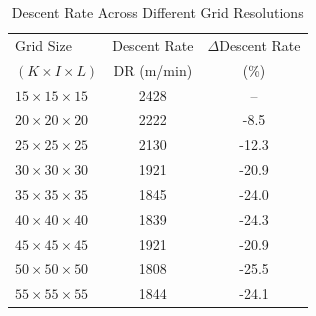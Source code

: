 \begin{table}[h]
    \centering
    \footnotesize
    \begin{tabular}{l c c}
        \hline
        Grid Size & Descent Rate & $\Delta$Descent Rate \\
        $(K \times I \times L)$ & DR (m/min) & (\%) \\
        \hline
        $15 \times 15 \times 15$ & 2428 & -- \\
        $20 \times 20 \times 20$ & 2222 & -8.5 \\
        $25 \times 25 \times 25$ & 2130 & -12.3 \\
        $30 \times 30 \times 30$ & 1921 & -20.9 \\
        $35 \times 35 \times 35$ & 1845 & -24.0 \\
        $40 \times 40 \times 40$ & 1839 & -24.3 \\
        $45 \times 45 \times 45$ & 1921 & -20.9 \\
        $50 \times 50 \times 50$ & 1808 & -25.5 \\
        $55 \times 55 \times 55$ & 1844 & -24.1 \\
        \hline
    \end{tabular}
    \caption{Descent Rate Across Different Grid Resolutions}
    \label{tab:descent_rate}
\end{table}

